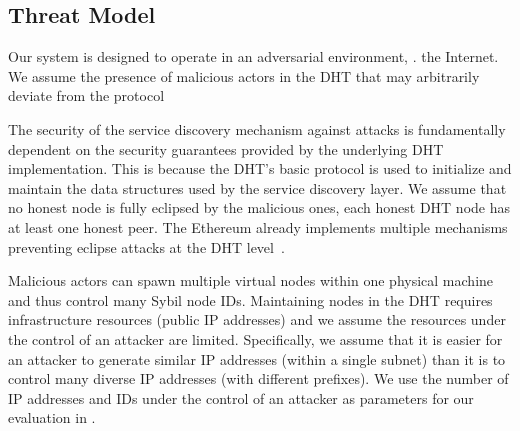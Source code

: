 \subsection{Threat Model}
\label{sec:threat}
Our system is designed to operate in an adversarial environment, \ie. the Internet. We assume the presence of malicious actors in the DHT that may arbitrarily deviate from the protocol%

The security of the service discovery mechanism against attacks is fundamentally dependent on the security guarantees provided by the underlying DHT implementation. This is because the DHT's basic protocol is used to initialize and maintain the data structures used by the service discovery layer. We assume that no honest node is fully eclipsed by the malicious ones, \ie each honest DHT node has at least one honest peer. The Ethereum already implements multiple mechanisms preventing eclipse attacks at the DHT level~\cite{marcus2018low, henningsen2019eclipsing}.  

Malicious actors can spawn multiple virtual nodes within one physical machine and thus control many Sybil node IDs. Maintaining nodes in the DHT requires infrastructure resources (public IP addresses) and we assume the resources under the control of an attacker are limited. Specifically, we assume that it is easier for an attacker to generate similar IP addresses (\ie within a single subnet) than it is to control many diverse IP addresses (with different prefixes). We use the number of IP addresses and IDs under the control of an attacker as parameters for our evaluation in .

